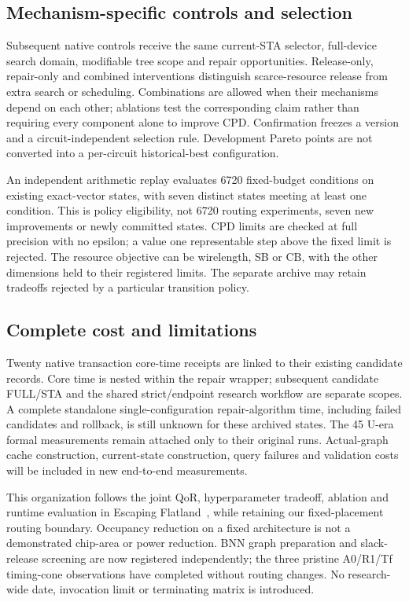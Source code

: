 \subsection{Mechanism-specific controls and selection}
Subsequent native controls receive the same current-STA selector, full-device search domain, modifiable tree scope and repair opportunities. Release-only, repair-only and combined interventions distinguish scarce-resource release from extra search or scheduling. Combinations are allowed when their mechanisms depend on each other; ablations test the corresponding claim rather than requiring every component alone to improve CPD. Confirmation freezes a version and a circuit-independent selection rule. Development Pareto points are not converted into a per-circuit historical-best configuration.

An independent arithmetic replay evaluates 6720 fixed-budget conditions on existing exact-vector states, with seven distinct states meeting at least one condition. This is policy eligibility, not 6720 routing experiments, seven new improvements or newly committed states. CPD limits are checked at full precision with no epsilon; a value one representable step above the fixed limit is rejected. The resource objective can be wirelength, SB or CB, with the other dimensions held to their registered limits. The separate archive may retain tradeoffs rejected by a particular transition policy.

\subsection{Complete cost and limitations}
Twenty native transaction core-time receipts are linked to their existing candidate records. Core time is nested within the repair wrapper; subsequent candidate FULL/STA and the shared strict/endpoint research workflow are separate scopes. A complete standalone single-configuration repair-algorithm time, including failed candidates and rollback, is still unknown for these archived states. The 45 U-era formal measurements remain attached only to their original runs. Actual-graph cache construction, current-state construction, query failures and validation costs will be included in new end-to-end measurements.

This organization follows the joint QoR, hyperparameter tradeoff, ablation and runtime evaluation in Escaping Flatland~\cite{flatland}, while retaining our fixed-placement routing boundary. Occupancy reduction on a fixed architecture is not a demonstrated chip-area or power reduction. BNN graph preparation and slack-release screening are now registered independently; the three pristine A0/R1/Tf timing-cone observations have completed without routing changes. No research-wide date, invocation limit or terminating matrix is introduced.
